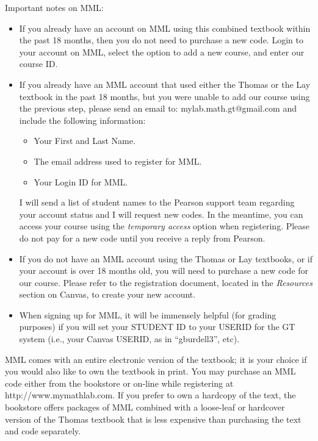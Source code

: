 \documentclass[11pt]{article}
\begin{document}
    Important notes on MML:
        \begin{itemize}
            \item If you already have an account on MML using this combined textbook within the past 18 months, then you do not need to purchase a new code.  Login to your account on MML, select the option to add a new course, and enter our course ID.
            
            \item If you already have an MML account that used either the Thomas or the Lay textbook in the past 18 months, but you were unable to add our course using the previous step, please send an email to: mylab.math.gt@gmail.com and include the following information:
            \begin{itemize}
                \item Your First and Last Name.
                \item The email address used to register for MML.
                \item Your Login ID for MML.
            \end{itemize}
        I will send a list of student names to the Pearson support team regarding your account status and I will request new codes.  In the meantime, you can access your course using the {\em temporary access} option when registering.  Please do not pay for a new code until you receive a reply from Pearson.
        
        \item If you do not have an MML account using the Thomas or Lay textbooks, or if your account is over 18 months old, you will need to purchase a new code for our course.  Please refer to the registration document, located in the {\em Resources} section on Canvas, to create your new account.
        
        \item When signing up for MML, it will be immensely helpful (for grading purposes) if you will set your STUDENT ID to your USERID for the GT system (i.e., your Canvas USERID, as in “gburdell3”, etc).
        \end{itemize}
        




MML comes with an entire electronic version of the textbook; it is your choice if you would also like to own the textbook in print. You may purchase an MML code either from the bookstore or on-line while registering at http://www.mymathlab.com. If you prefer to own a hardcopy of the text, the bookstore offers packages of MML combined with a loose-leaf or hardcover version of the Thomas textbook that is less expensive than purchasing the text and code separately.
\end{document}
